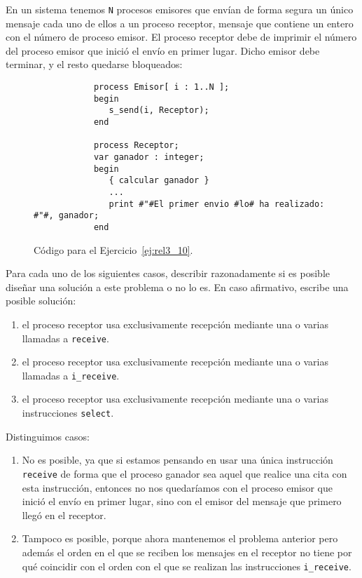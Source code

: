 \begin{ejercicio}\label{ej:rel3_10}
    En un sistema tenemos \verb|N| procesos emisores que envían de forma segura un único mensaje cada uno de ellos a un proceso receptor, mensaje que contiene un entero con el número de proceso emisor. El proceso receptor debe de imprimir el número del proceso emisor que inició el envío en primer lugar. Dicho emisor debe terminar, y el resto quedarse bloqueados:
    \begin{figure}[H]
        \centering
        \begin{verbatim}
            process Emisor[ i : 1..N ];
            begin
               s_send(i, Receptor);
            end

            process Receptor;
            var ganador : integer;
            begin
               { calcular ganador }
               ...
               print #"#El primer envio #lo# ha realizado: #"#, ganador;
            end
        \end{verbatim}
        \caption{Código para el Ejercicio~\ref{ej:rel3_10}.}
        \label{fig:cod_10}
    \end{figure}
    Para cada uno de los siguientes casos, describir razonadamente si es posible diseñar una solución a este problema o no lo es. En caso afirmativo, escribe una posible solución:
    \begin{enumerate}[label=(\alph*)]
        \item el proceso receptor usa exclusivamente recepción mediante una o varias llamadas a \verb|receive|.
        \item el proceso receptor usa exclusivamente recepción mediante una o varias llamadas a \verb|i_receive|.
        \item el proceso receptor usa exclusivamente recepción mediante una o varias instrucciones \verb|select|.
    \end{enumerate}
    Distinguimos casos:
    \begin{enumerate}[label=(\alph*)]
        \item No es posible, ya que si estamos pensando en usar una única instrucción \verb|receive| de forma que el proceso ganador sea aquel que realice una cita con esta instrucción, entonces no nos quedaríamos con el proceso emisor que inició el envío en primer lugar, sino con el emisor del mensaje que primero llegó en el receptor.
        \item Tampoco es posible, porque ahora mantenemos el problema anterior pero además el orden en el que se reciben los mensajes en el receptor no tiene por qué coincidir con el orden con el que se realizan las instrucciones \verb|i_receive|.

\end{enumerate}
\end{ejercicio}
